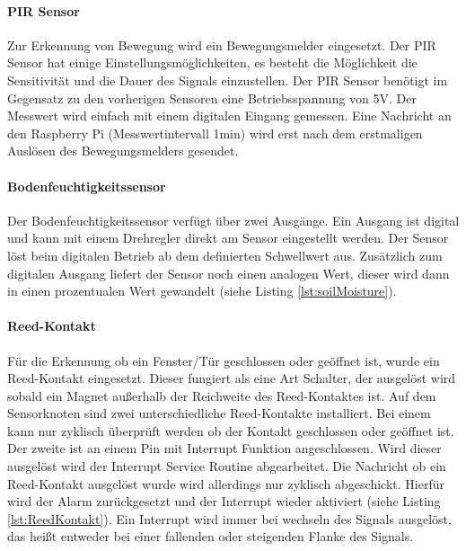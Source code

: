 \paragraph{PIR Sensor} Zur Erkennung von Bewegung wird ein Bewegungsmelder eingesetzt. Der PIR Sensor hat einige Einstellungsmöglichkeiten, es besteht die Möglichkeit die Sensitivität und die Dauer des Signals einzustellen. Der PIR Sensor benötigt im Gegensatz zu den vorherigen Sensoren eine Betriebsspannung von 5V. Der Messwert wird einfach mit einem digitalen Eingang gemessen. Eine Nachricht an den Raspberry Pi (Messwertintervall 1min) wird erst nach dem erstmaligen Auslösen des Bewegungsmelders gesendet.
\paragraph{Bodenfeuchtigkeitssensor} Der Bodenfeuchtigkeitssensor verfügt über zwei Ausgänge. Ein Ausgang ist digital und kann mit einem Drehregler direkt am Sensor eingestellt werden. Der Sensor löst beim digitalen Betrieb ab dem definierten Schwellwert aus. Zusätzlich zum digitalen Ausgang liefert der Sensor noch einen analogen Wert, dieser wird dann in einen prozentualen Wert gewandelt (siehe Listing \ref{lst:soilMoisture}). 


\paragraph{Reed-Kontakt} Für die Erkennung ob ein Fenster/Tür geschlossen oder geöffnet ist, wurde ein Reed-Kontakt eingesetzt. Dieser fungiert als eine Art Schalter, der ausgelöst wird sobald ein Magnet außerhalb der Reichweite des Reed-Kontaktes ist. Auf dem Sensorknoten sind zwei unterschiedliche Reed-Kontakte installiert. Bei einem kann nur zyklisch überprüft werden ob der Kontakt geschlossen oder geöffnet ist. Der zweite ist an einem Pin mit Interrupt Funktion angeschlossen. Wird dieser ausgelöst wird der Interrupt Service Routine abgearbeitet. Die Nachricht ob ein Reed-Kontakt ausgelöst wurde wird allerdings nur zyklisch abgeschickt. Hierfür wird der Alarm zurückgesetzt und der Interrupt wieder aktiviert (siehe Listing \ref{lst:ReedKontakt}). Ein Interrupt wird immer bei wechseln des Signals ausgelöst, das heißt entweder bei einer fallenden oder steigenden Flanke des Signals.


